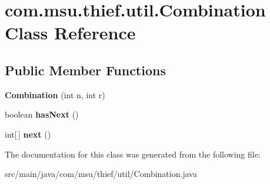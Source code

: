 \hypertarget{classcom_1_1msu_1_1thief_1_1util_1_1Combination}{\section{com.\-msu.\-thief.\-util.\-Combination Class Reference}
\label{classcom_1_1msu_1_1thief_1_1util_1_1Combination}
}
\subsection*{Public Member Functions}
\begin{DoxyCompactItemize}
\item 
\hypertarget{classcom_1_1msu_1_1thief_1_1util_1_1Combination_a285d340db5caf6d5a81c0feeac737904}{{\bfseries Combination} (int n, int r)}\label{classcom_1_1msu_1_1thief_1_1util_1_1Combination_a285d340db5caf6d5a81c0feeac737904}

\item 
\hypertarget{classcom_1_1msu_1_1thief_1_1util_1_1Combination_a19d0c00f8aaf5b9b0cf535f5182f4aca}{boolean {\bfseries has\-Next} ()}\label{classcom_1_1msu_1_1thief_1_1util_1_1Combination_a19d0c00f8aaf5b9b0cf535f5182f4aca}

\item 
\hypertarget{classcom_1_1msu_1_1thief_1_1util_1_1Combination_a5637251e7695551c555fa67c1b1241be}{int\mbox{[}$\,$\mbox{]} {\bfseries next} ()}\label{classcom_1_1msu_1_1thief_1_1util_1_1Combination_a5637251e7695551c555fa67c1b1241be}

\end{DoxyCompactItemize}


The documentation for this class was generated from the following file\-:\begin{DoxyCompactItemize}
\item 
src/main/java/com/msu/thief/util/Combination.\-java\end{DoxyCompactItemize}
